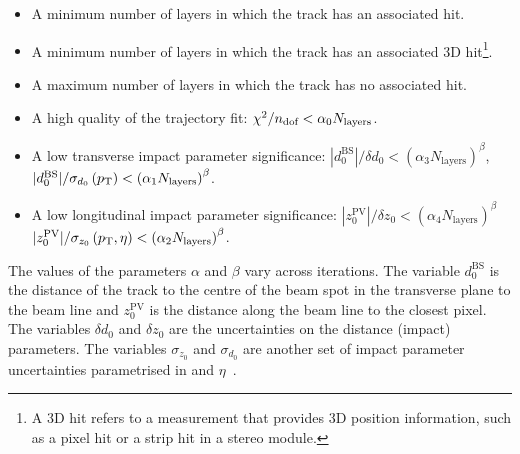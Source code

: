 \begin{itemize}
\item A minimum number of layers in which the track has an associated hit.
\item A minimum number of layers in which the track has an associated 3D hit\footnote{A 3D hit refers to a measurement that provides 3D position information, such as a pixel hit or a strip hit in a stereo module.}.
\item A maximum number of layers in which the track has no associated hit.
\item A high quality of the trajectory fit: $\chi^2/n_{\text{dof}} < \alpha_0 N_{\text{layers}}$.
\item A low transverse impact parameter significance:  $|d_0^{\text{BS}}|/\delta d_0 < \left( \alpha_3 N_{\text{layers}} \right)^{\beta}$,\\
\hspace*{231pt}                                        $|d_0^{\text{BS}}|/\sigma_{d_0} \left(p_{\text{T}}\right) < \left( \alpha_1 N_{\text{layers}} \right)^{\beta}$.
\item A low longitudinal impact parameter significance: $|z_0^{\text{PV}}|/\delta z_0 < \left( \alpha_4 N_{\text{layers}} \right)^{\beta}$\\
\hspace*{240pt}                                         $|z_0^{\text{PV}}|/\sigma_{z_0} \left(p_{\text{T}},\eta\right) < \left( \alpha_2 N_{\text{layers}} \right)^{\beta}$.
\end{itemize}
The values of the parameters $\alpha$ and $\beta$ vary across iterations.
The variable $d_0^{\text{BS}}$ is the distance of the track to the centre of the beam spot in the transverse plane to the beam line and $z_0^{\text{PV}}$ is the distance along the beam line to the closest pixel.
The variables $\delta d_0$ and $\delta z_0$ are the uncertainties on the distance (impact) parameters.
The variables $\sigma_{z_0}$ and $\sigma_{d_0}$ are another set of impact parameter uncertainties parametrised in \pt and $\eta$~\cite{bib:CMS:tracking_8TeV}.

